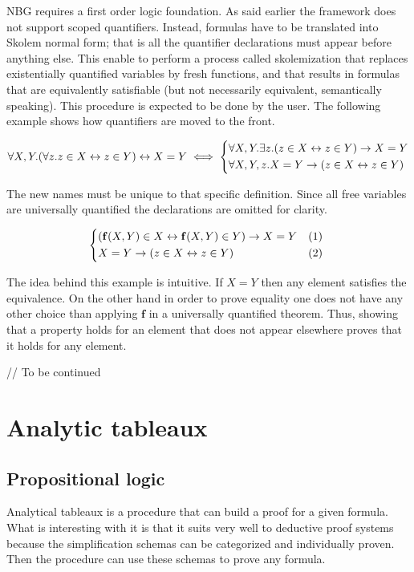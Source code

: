 \documentclass[acmlarge]{acmart}
\begin{document}
NBG requires a first order logic foundation. As said earlier the framework does not support scoped quantifiers. Instead, formulas have to be translated into Skolem normal form; that is all the quantifier declarations must appear before anything else. This enable to perform a process called skolemization that replaces existentially quantified variables by fresh functions, and that results in formulas that are equivalently satisfiable (but not necessarily equivalent, semantically speaking). This procedure is expected to be done by the user. The following example shows how quantifiers are moved to the front.

\[
\forall X, Y. (\forall z. z \in X \leftrightarrow z \in Y) \leftrightarrow X = Y \iff
\begin{dcases*}
\forall X, Y. \exists z. (z \in X \leftrightarrow z \in Y) \rightarrow X = Y \\
\forall X, Y, z. X = Y \rightarrow (z \in X \leftrightarrow z \in Y)
\end{dcases*}
\]

The new names must be unique to that specific definition. Since all free variables are universally quantified the declarations are omitted for clarity.

\[
\begin{dcases*}
(\mathbf{f}(X, Y) \in X \leftrightarrow \mathbf{f}(X, Y) \in Y) \rightarrow X = Y & (1) \\
X = Y \rightarrow (z \in X \leftrightarrow z \in Y) & (2)
\end{dcases*}
\]

The idea behind this example is intuitive. If $X = Y$ then any element satisfies the equivalence. On the other hand in order to prove equality one does not have any other choice than applying $\mathbf{f}$ in a universally quantified theorem. Thus, showing that a property holds for an element that does not appear elsewhere proves that it holds for any element.

// To be continued

\section{Analytic tableaux}

\subsection{Propositional logic}

Analytical tableaux is a procedure that can build a proof for a given formula. What is interesting with it is that it suits very well to deductive proof systems because the simplification schemas can be categorized and individually proven. Then the procedure can use these schemas to prove any formula.
\end{document}
